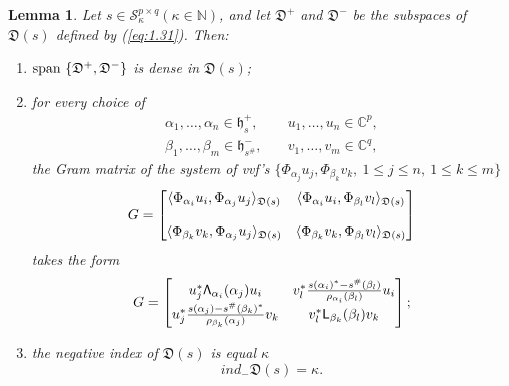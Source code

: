 \documentclass[12pt,twoside,a4paper]{amsart}
\newtheorem{lem}[thm]{Lemma}
\theoremstyle{definition}
\numberwithin{equation}{section}
\begin{document}
\begin{lem}\label{lem:1.15}
Let $s\in {\mathcal S}^{p\times q}_\kappa(\kappa\in {{\mathbb N}})$, and let ${{\mathfrak D}}^+$
and ${{\mathfrak D}}^-$ be the subspaces of ${{\mathfrak D}}(s)$ defined by (\ref{eq:1.31}). Then:
\begin{enumerate}
    \item [\rm(1)] $\textup{span }\{{{\mathfrak D}}^+,{{\mathfrak D}}^-\}$ is dense in ${{\mathfrak D}}(s)$;
    \item [\rm(2)]for every choice of
\begin{equation}\label{eq:1.35}
\begin{split}
     \alpha_1,\ldots,\alpha_n\in {{\mathfrak h}}^+_s,&\quad  u_1,\ldots,u_n\in {\mathbb{C}}^p,\\
     \beta_1,\ldots,\beta_m\in {{\mathfrak h}}^-_{s^\#}, &\quad v_1,\ldots,v_m\in {\mathbb{C}}^q,
   \end{split}
\end{equation}
the Gram matrix of the system of vvf's
$
\{\Phi_{\alpha_j}u_j, \Phi_{\beta_k}v_k,\ 1\leqslant j\leqslant
n,\ 1\leqslant k\leqslant m\}
$
\begin{equation}\label{eq:1.36a}
G=\begin{bmatrix}
{{\displaystyle} \langle\Phi_{\alpha_i}u_i,\Phi_{\alpha_j}u_j\rangle_{{{\mathfrak D}}(s)}} &
{{\displaystyle} \langle\Phi_{\alpha_i}u_i,\Phi_{\beta_l}v_l\rangle_{{{\mathfrak D}}(s)}}\\
&\\
{{\displaystyle} \langle\Phi_{\beta_k}v_k,\Phi_{\alpha_j}u_j\rangle_{{{\mathfrak D}}(s)}} &
{{\displaystyle} \langle\Phi_{\beta_k}v_k,\Phi_{\beta_l}v_l\rangle_{{{\mathfrak D}}(s)}}
\end{bmatrix}
\end{equation}
takes the form
\begin{equation}\label{GramLL}
G=\begin{bmatrix} {{\displaystyle} u_j^*{\mathsf
    \Lambda}_{\alpha_i}(\alpha_j)u_i }&
{{\displaystyle} v_l^*\frac{s(\alpha_i)^*-s^\#(\beta_l)}{\rho_{\alpha_i}(\beta_l)}u_i}\\
{{\displaystyle}
u_j^*\frac{s(\alpha_j)-s^\#(\beta_k)^*}{\rho_{\beta_k}(\alpha_j)}v_k}
& {{\displaystyle} v_l^*{\mathsf
    L}_{\beta_k}(\beta_l)v_k}
\end{bmatrix};
\end{equation}
  \item [\rm(3)]the negative index of ${{\mathfrak D}}(s)$ is equal $\kappa$
    \begin{equation}\label{eq:1.37}
   ind_-{{\mathfrak D}}(s)=\kappa.
   \end{equation}
\end{enumerate}
\end{lem}
\end{document}
